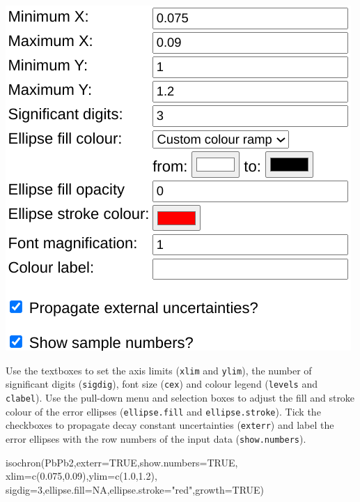 \begin{refsection}
\begin{enumerate}
\noindent\begin{minipage}[t]{.4\linewidth}
\strut\vspace*{-\baselineskip}\newline
\includegraphics[width=\linewidth]{../figures/PbPbIsochronOtherOptions.png}
\end{minipage}
\begin{minipage}[t]{.6\linewidth}
  Use the textboxes to set the axis limits (\texttt{xlim} and
  \texttt{ylim}), the number of significant digits (\texttt{sigdig}),
  font size (\texttt{cex}) and colour legend (\texttt{levels} and
  \texttt{clabel}). Use the pull-down menu and selection boxes to
  adjust the fill and stroke colour of the error ellipses
  (\texttt{ellipse.fill} and \texttt{ellipse.stroke}). Tick the
  checkboxes to propagate decay constant uncertainties
  (\texttt{exterr}) and label the error ellipses with the row numbers
  of the input data (\texttt{show.numbers}).
\end{minipage}

\begin{script}[firstnumber=2]
isochron(PbPb2,exterr=TRUE,show.numbers=TRUE,
         xlim=c(0.075,0.09),ylim=c(1.0,1.2),
         sigdig=3,ellipse.fill=NA,ellipse.stroke="red",growth=TRUE)
\end{script}
  
\end{enumerate}


\end{refsection}
